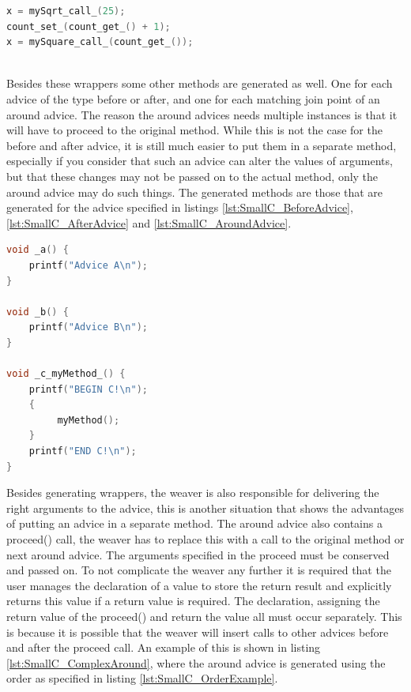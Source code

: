 \documentclass[a4paper]{report}
\begin{document}
\begin{minipage}{0.45\textwidth}
\begin{lstlisting}[language=C, caption=Example of code after weaving, label=lst:SmallC_WrapperUsageAfter]
x = mySqrt_call_(25);
count_set_(count_get_() + 1);
x = mySquare_call_(count_get_());
\end{lstlisting}
\end{minipage}\\
Besides these wrappers some other methods are generated as well. One for each advice of the type before or after, and one for each matching join point of an around advice. The reason the around advices needs multiple instances is that it will have to proceed to the original method. While this is not the case for the before and after advice, it is still much easier to put them in a separate method, especially if you consider that such an advice can alter the values of arguments, but that these changes may not be passed on to the actual method, only the around advice may do such things. The generated methods are those that are generated for the advice specified in listings \ref{lst:SmallC_BeforeAdvice}, \ref{lst:SmallC_AfterAdvice} and \ref{lst:SmallC_AroundAdvice}.\\
\begin{lstlisting}[language=C, caption=Generated methods, label=lst:SmallC_GeneratedMethods]
void _a() {
	printf("Advice A\n");
}

void _b() {
	printf("Advice B\n");
}

void _c_myMethod_() {
	printf("BEGIN C!\n");
	{
		 myMethod();
	}
	printf("END C!\n");
}
\end{lstlisting}
Besides generating wrappers, the weaver is also responsible for delivering the right arguments to the advice, this is another situation that shows the advantages of putting an advice in a separate method. The around advice also contains a proceed() call, the weaver has to replace this with a call to the original method or next around advice. The arguments specified in the proceed must be conserved and passed on. To not complicate the weaver any further it is required that the user manages the declaration of a value to store the return result and explicitly returns this value if a return value is required. The declaration, assigning the return value of the proceed() and return the value all must occur separately. This is because it is possible that the weaver will insert calls to other advices before and after the proceed call. An example of this is shown in listing \ref{lst:SmallC_ComplexAround}, where the around advice is generated using the order as specified in listing \ref{lst:SmallC_OrderExample}.\\
\end{document}
